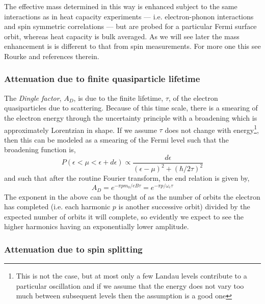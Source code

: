 The effective mass determined in this way is enhanced subject to the same interactions as in heat capacity experiments --- i.e. electron-phonon interactions and spin symmetric correlations --- but are probed for a particular Fermi surface orbit, whereas heat capacity is bulk averaged. As we will see later the mass enhancement is is different to that from spin measurements. For more one this see Rourke \etal\cite{Rourke2010b} and references therein.

\subsubsection{Attenuation due to finite quasiparticle lifetime}

The \textit{Dingle factor}, $A_D$, is due to the finite lifetime, $\tau$, of the electron quasiparticles due to scattering. Because of this time scale, there is a smearing of the electron energy through the uncertainty principle with a broadening which is approximately Lorentzian in shape. If we assume $\tau$ does not change with energy\footnote{This is not the case, but at most only a few Landau levels contribute to a particular oscillation and if we assume that the energy does not vary too much between subsequent levels then the assumption is a good one}, then this can be modeled as a smearing of the Fermi level such that the broadening function is,
\begin{equation}
  P(\epsilon < \mu < \epsilon + d\epsilon) \propto \frac{d\epsilon}{(\epsilon - \mu)^2 + (\hbar/2\tau)^2}
\end{equation}
and such that after the routine Fourier transform, the end relation is given by,
\begin{equation}
  A_D = e^{-\pi p m_0/e B\tau} = e^{-\pi p/\omega_c\tau} 
\end{equation}
The exponent in the above can be thought of as the number of orbits the electron has completed (i.e. each harmonic $p$ is another successive orbit) divided by the expected number of orbits it will complete, so evidently we expect to see the higher harmonics having an exponentially lower amplitude.

\subsubsection{Attenuation due to spin splitting}


